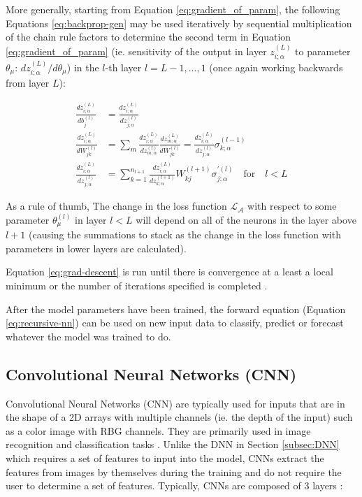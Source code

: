 \begin{enumerate}
    More generally, starting from Equation \ref{eq:gradient_of_param}, the following Equations \ref{eq:backprop-gen} may be used iteratively by sequential multiplication of the chain rule factors to determine the second term in Equation \ref{eq:gradient_of_param} (ie. sensitivity of the output in layer $z_{i;\alpha}^{(L)}$ to parameter $\theta_\mu$: $dz_{i;\alpha}^{(L)}/d\theta_\mu$) in the $l$-th layer $l=L-1,...,1$ (once again working backwards from layer $L$):

    \begin{equation}
        \label{eq:backprop-gen}
        \begin{split}
        \frac{dz_{i;\alpha}^{(L)}}{db_j^{(l)}} &= \frac{dz_{i;\alpha}^{(L)}}{dz_{j;\alpha}^{(l)}} \\
        \frac{dz_{i;\alpha}^{(L)}}{dW_{jk}^{(l)}} &= \sum_m \frac{dz_{i;\alpha}^{(L)}}{dz_{m;\alpha}^{(l)}} \frac{dz_{m;\alpha}^{(L)}}{dW_{jk}^{(l)}} = \frac{dz_{i;\alpha}^{(L)}}{dz_{j;\alpha}^{(l)}}\sigma_{k;\alpha}^{(l-1)} \\
        \frac{dz_{i;\alpha}^{(L)}}{dz_{j;\alpha}^{(l)}} &= \sum^{n_{l+1}}_{k=1} \frac{dz_{i;\alpha}^{(L)}}{dz_{k;\alpha}^{(l+1)}}W_{kj}^{(l+1)}\sigma_{j;\alpha}^{\prime (l)} \quad \text{for} \quad l<L
        \end{split}
    \end{equation}

    As a rule of thumb, The change in the loss function $\mathcal{L}_{\mathcal{A}}$ with respect to some parameter $\theta_\mu^{(l)}$ in layer $l < L$ will depend on all of the neurons in the layer above $l+1$ (causing the summations to stack as the change in the loss function with parameters in lower layers are calculated).

    Equation \ref{eq:grad-descent} is run until there is convergence at a least a local minimum or the number of iterations specified is completed \cite{robertsPrinciplesDeepLearning2022b}.
\end{enumerate}

After the model parameters have been trained, the forward equation (Equation \ref{eq:recursive-nn}) can be used on new input data to classify, predict or forecast whatever the model was trained to do.


\clearpage
\subsection{Convolutional Neural Networks (CNN)}
Convolutional Neural Networks (CNN) are typically used for inputs that are in the shape of a 2D arrays with multiple channels (ie. the depth of the input) such as a color image with RBG channels. They are primarily used in image recognition and classification tasks \cite{tayeTheoreticalUnderstandingConvolutional2023}. Unlike the DNN in Section \ref{subsec:DNN} which requires a set of features to input into the model, CNNs extract the features from images by themselves during the training and do not require the user to determine a set of features. Typically, CNNs are composed of 3 layers \cite{tayeTheoreticalUnderstandingConvolutional2023,prakashAdvancedDeepLearning2021}: 

